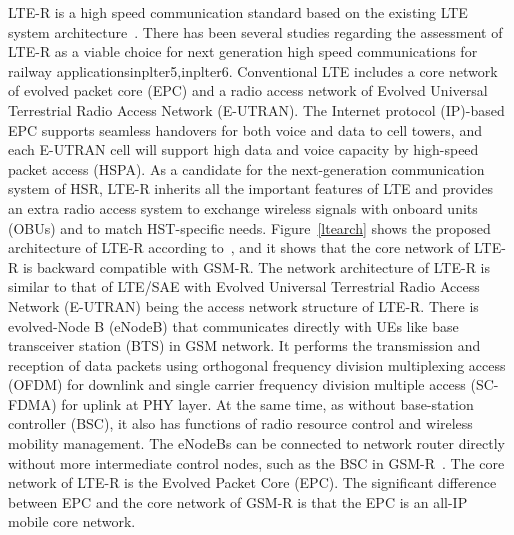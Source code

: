 LTE-R is a high speed communication standard based on the existing LTE system architecture~\cite{inplter4}. There has been several studies regarding the assessment of LTE-R as a viable choice for next generation high speed communications for railway applications{inplter5,inplter6}. Conventional LTE includes a core network of evolved packet core (EPC) and a radio access network of Evolved Universal  Terrestrial  Radio  Access  Network (E-UTRAN). The  Internet  protocol (IP)-based  EPC  supports  seamless handovers for both voice and data to cell towers, and each E-UTRAN cell will support high data and voice capacity by high-speed  packet  access  (HSPA).  As  a  candidate for the next-generation  communication  system  of  HSR,  LTE-R  inherits all the important features of LTE and provides an extra radio access system to exchange wireless signals with onboard  units (OBUs)  and to match HST-specific  needs. Figure~\ref{ltearch} shows the proposed architecture of LTE-R according to~\cite{trlter2}, and it shows that the core network of LTE-R is backward compatible with GSM-R. The network architecture of LTE-R is similar to that of LTE/SAE with  Evolved Universal Terrestrial Radio Access Network (E-UTRAN) being the access network structure of LTE-R. There is evolved-Node B (eNodeB) that communicates directly with UEs like base transceiver station (BTS) in GSM network. It performs the transmission and reception of data packets using orthogonal frequency division multiplexing access (OFDM) for downlink and single carrier  frequency division multiple access (SC-FDMA) for uplink at PHY layer. At the same time, as without base-station controller (BSC), it also has functions of  radio  resource  control and wireless  mobility  management.  The eNodeBs can be connected to network router directly without more intermediate control nodes, such as the BSC in GSM-R~\cite{tingting2010high}. The core network of LTE-R is the Evolved Packet Core (EPC). The significant difference between EPC and the core network of GSM-R is that the EPC is an all-IP mobile core network.


